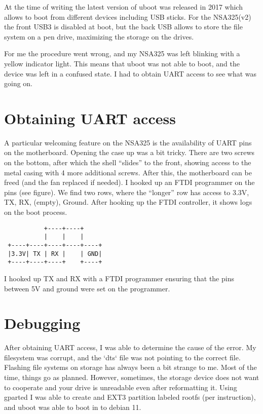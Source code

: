 \documentclass[11pt]{article}
\begin{document}
At  the time  of writing  the  latest version  of uboot  was
released in 2017 which allows to boot from different devices
including USB sticks.  For the NSA325(v2) the  front USB3 is
disabled at boot, but the back  USB allows to store the file
system on a pen drive, maximizing the storage on the drives.

For  me the  procedure went  wrong, and  my NSA325  was left
blinking  with a  yellow  indicator light.  This means  that
uboot was  not able to  boot, and the  device was left  in a
confused state. I had to obtain  UART access to see what was
going on.

\section{Obtaining UART access}
\label{sec:org2ba666d}
A  particular  welcoming  feature   on  the  NSA325  is  the
availability of  UART pins  on the motherboard.  Opening the
case  up was  a  bit tricky.  There are  two  screws on  the
bottom, after which the shell ``slides'' to the front, showing
access to  the metal casing  with 4 more  additional screws.
After  this,  the motherboard  can  be  freed (and  the  fan
replaced if needed).  I hooked up an FTDI  programmer on the
pins (see figure). We find  two rows, where the ``longer'' row
has access to  3.3V, TX, RX, (empty),  Ground. After hooking
up the FTDI controller, it shows logs on the boot process.

\begin{verbatim}
           +----+----+
           |    |    |
 +----+----+----+----+----+
 |3.3V| TX | RX |    | GND|
 +----+----+----+    +----+
\end{verbatim}

I hooked up  TX and RX with a FTDI  programmer ensuring that
the pins between 5V and ground were set on the programmer.

\section{Debugging}
\label{sec:orga127f21}
After obtaining  UART access,  I was  able to  determine the
cause of the error. My filesystem was corrupt, and the `dts`
file was  not pointing  to the  correct file.  Flashing file
systems on storage has always been a bit strange to me. Most
of the time,  things go as planned.  However, sometimes, the
storage device does not want  to cooperate and your drive is
unreadable even  after reformatting it. Using  gparted I was
able  to  create and  EXT3  partition  labeled rootfs  (per
instruction), and uboot was able to boot in to debian 11.
\end{document}
